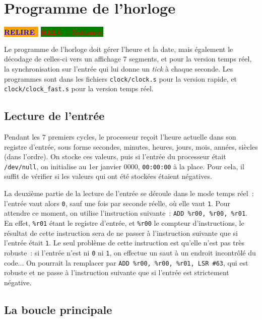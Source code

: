 \documentclass[11pt,a4paper]{article}
\newcommand{\relire}{\colorbox{orange}{\textcolor{blue}{\textbf{RELIRE}~}}}
\newcommand{\relu}[1]{\colorbox{green}{\textcolor{red}{\textbf{RELU~:} #1}}}
\begin{document}
\section{Programme de l'horloge} \label{sec:clock}

\relire
\relu{Nathanaël}

Le programme de l'horloge doit gérer l'heure et la date, mais
également le décodage de celles-ci vers un affichage 7 segments, et
pour la version temps réel, la synchronisation sur l'entrée qui lui
donne un \textit{tick} à chaque seconde. Les programmes sont dans les
fichiers \verb!clock/clock.s! pour la version rapide, et
\verb!clock/clock_fast.s! pour la version temps réel.

\subsection{Lecture de l'entrée}

Pendant les 7 premiers cycles, le processeur reçoit l'heure actuelle
dans son registre d'entrée, sous forme secondes, minutes, heures,
jours, mois, années, siècles (dans l'ordre). On stocke ces valeurs,
puis si l'entrée du processeur était \verb!/dev/null!, on initialise au
1er janvier 0000, \verb!00:00:00! à la place. Pour cela, il suffit de
vérifier si les valeurs qui ont été stockées étaient négatives.

La deuxième partie de la lecture de l'entrée se déroule dans le mode
temps réel~: l'entrée vaut alors \verb!0!, sauf une fois par seconde
réelle, où elle vaut \verb!1!. Pour attendre ce moment, on utilise
l'instruction suivante~: \verb!ADD %r00, %r00, %r01!. En effet,
\verb!%r01! étant le registre d'entrée, et \verb!%r00! le compteur
d'instructions, le résultat de cette instruction sera de ne passer à
l'instruction suivante que si l'entrée était \verb!1!. Le seul
problème de cette instruction est qu'elle n'est pas très robuste~: si
l'entrée n'est ni \verb!0! ni \verb!1!, on effectue un saut à un
endroit incontrôlé du code... On pourrait la remplacer par
\verb!ADD %r00, %r00, %r01, LSR #63!, qui est robuste et ne passe à
l'instruction suivante que si l'entrée est strictement négative.

\subsection{La boucle principale}
\end{document}
